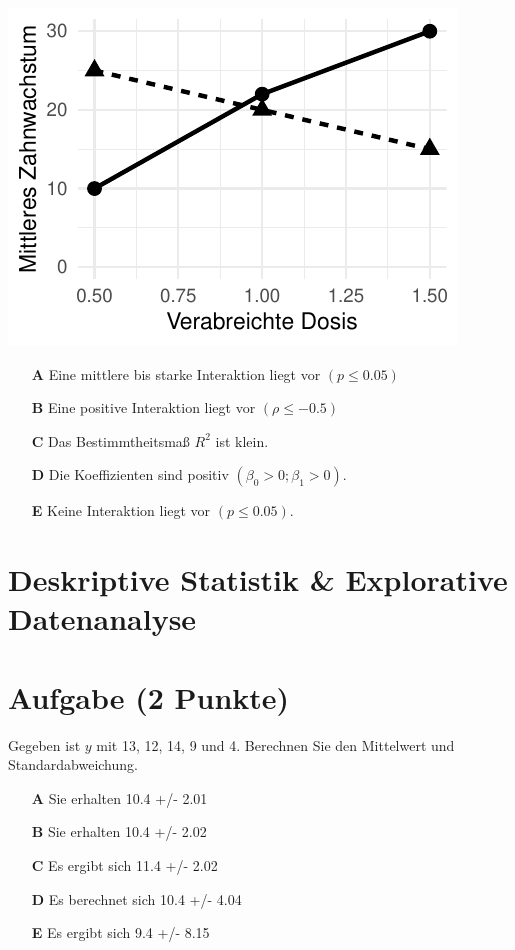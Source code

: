\documentclass[a4paper, 9pt]{scrartcl}\usepackage[]{graphicx}\usepackage[]{xcolor}
\makeatletter
\def\maxwidth{ %
  \ifdim\Gin@nat@width>\linewidth
    \linewidth
  \else
    \Gin@nat@width
  \fi
}
\makeatother
\begin{document}
{\centering \includegraphics[width=\maxwidth]{img/mc-anova-02-a-1} 

}







\begin{enumerate}
\item [\textbf{A} \msquare] Eine mittlere bis starke Interaktion liegt vor $(p \leq 0.05)$
\item [\textbf{B} \msquare] Eine positive Interaktion liegt vor $(\rho \leq -0.5)$ 
\item [\textbf{C} \msquare] Das Bestimmtheitsmaß $R^2$ ist klein.
\item [\textbf{D} \msquare] Die Koeffizienten sind positiv $(\beta_0 > 0; \beta_1 > 0)$.
\item [\textbf{E} \msquare] Keine Interaktion liegt vor $(p \leq 0.05)$.
\end{enumerate} 
\section*{Deskriptive Statistik \& Explorative Datenanalyse}

\section{Aufgabe \hfill (2 Punkte)}




Gegeben ist $y$ mit 13, 12, 14, 9 und 4. Berechnen Sie den Mittelwert und Standardabweichung.



\begin{enumerate}
\item [\textbf{A} \msquare] Sie erhalten 10.4 +/- 2.01
\item [\textbf{B} \msquare] Sie erhalten 10.4 +/- 2.02
\item [\textbf{C} \msquare] Es ergibt sich 11.4 +/- 2.02
\item [\textbf{D} \msquare] Es berechnet sich 10.4 +/- 4.04
\item [\textbf{E} \msquare] Es ergibt sich 9.4 +/- 8.15
\end{enumerate} 
\end{document}
